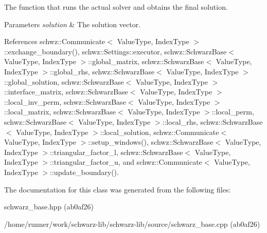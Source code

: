 The function that runs the actual solver and obtains the final solution. 


\begin{DoxyParams}{Parameters}
{\em solution} & The solution vector. \\
\hline
\end{DoxyParams}


References schwz\+::\+Communicate$<$ Value\+Type, Index\+Type $>$\+::exchange\+\_\+boundary(), schwz\+::\+Settings\+::executor, schwz\+::\+Schwarz\+Base$<$ Value\+Type, Index\+Type $>$\+::global\+\_\+matrix, schwz\+::\+Schwarz\+Base$<$ Value\+Type, Index\+Type $>$\+::global\+\_\+rhs, schwz\+::\+Schwarz\+Base$<$ Value\+Type, Index\+Type $>$\+::global\+\_\+solution, schwz\+::\+Schwarz\+Base$<$ Value\+Type, Index\+Type $>$\+::interface\+\_\+matrix, schwz\+::\+Schwarz\+Base$<$ Value\+Type, Index\+Type $>$\+::local\+\_\+inv\+\_\+perm, schwz\+::\+Schwarz\+Base$<$ Value\+Type, Index\+Type $>$\+::local\+\_\+matrix, schwz\+::\+Schwarz\+Base$<$ Value\+Type, Index\+Type $>$\+::local\+\_\+perm, schwz\+::\+Schwarz\+Base$<$ Value\+Type, Index\+Type $>$\+::local\+\_\+rhs, schwz\+::\+Schwarz\+Base$<$ Value\+Type, Index\+Type $>$\+::local\+\_\+solution, schwz\+::\+Communicate$<$ Value\+Type, Index\+Type $>$\+::setup\+\_\+windows(), schwz\+::\+Schwarz\+Base$<$ Value\+Type, Index\+Type $>$\+::triangular\+\_\+factor\+\_\+l, schwz\+::\+Schwarz\+Base$<$ Value\+Type, Index\+Type $>$\+::triangular\+\_\+factor\+\_\+u, and schwz\+::\+Communicate$<$ Value\+Type, Index\+Type $>$\+::update\+\_\+boundary().



The documentation for this class was generated from the following files\+:\begin{DoxyCompactItemize}
\item 
schwarz\+\_\+base.\+hpp (ab0af26)\item 
/home/runner/work/schwarz-\/lib/schwarz-\/lib/source/schwarz\+\_\+base.\+cpp (ab0af26)\end{DoxyCompactItemize}
